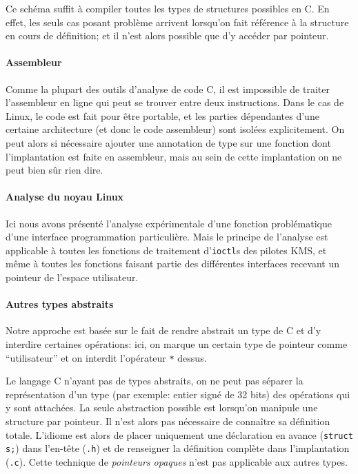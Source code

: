 Ce schéma suffit à compiler toutes les types de structures possibles en C. En
effet, les seuls cas posant problème arrivent lorsqu'on fait référence à la
structure en cours de définition; et il n'est alors possible que d'y accéder
par pointeur.

\paragraph{Assembleur}

Comme la plupart des outils d'analyse de code C, il est impossible de traiter
l'assembleur en ligne qui peut se trouver entre deux instructions. Dans le cas
de Linux, le code est fait pour être portable, et les parties dépendantes d'une
certaine architecture (et donc le code assembleur) sont isolées explicitement.
On peut alors si nécessaire ajouter une annotation de type sur une fonction dont
l'implantation est faite en assembleur, mais au sein de cette implantation on ne
peut bien sûr rien dire.

\paragraph{Analyse du noyau Linux}

Ici nous avons présenté l'analyse expérimentale d'une fonction problématique
d'une interface programmation particulière. Mais le principe de l'analyse est
applicable à toutes les fonctions de traitement d'\texttt{ioctl}s des pilotes
KMS, et même à toutes les fonctions faisant partie des différentes interfaces
recevant un pointeur de l'espace utilisateur.

\paragraph{Autres types abstraits}

Notre approche est basée sur le fait de rendre abstrait un type de C et
d'y interdire certaines opérations: ici, on marque un certain type de pointeur
comme ``utilisateur'' et on interdit l'opérateur \texttt{*} dessus.

Le langage C n'ayant pas de types abstraits, on ne peut pas séparer la
représentation d'un type (par exemple: entier signé de 32 bits) des opérations
qui y sont attachées. La seule abstraction possible est lorsqu'on manipule une
structure par pointeur. Il n'est alors pas nécessaire de connaître sa définition
totale. L'idiome est alors de placer uniquement une déclaration en avance
(\texttt{struct s;}) dans l'en-tête (\texttt{.h}) et de renseigner la définition
complète dans l'implantation (\texttt{.c}). Cette technique de \emph{pointeurs
opaques} n'est pas applicable aux autres types.

